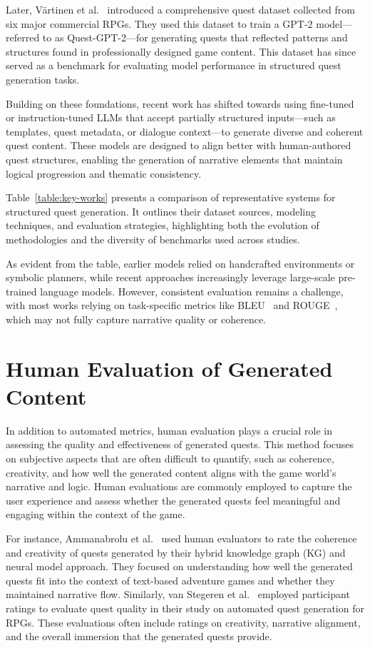 Later, V{\"a}rtinen et al.~\cite{vartinen2022generating} introduced a comprehensive quest dataset collected from
six major commercial RPGs. They used this dataset to train a GPT-2 model—referred
to as Quest-GPT-2—for generating quests that reflected patterns and structures found in
professionally designed game content. This dataset has since served as a benchmark for
evaluating model performance in structured quest generation tasks.

Building on these foundations, recent work has shifted towards using fine-tuned or
instruction-tuned LLMs that accept partially structured inputs—such as templates, quest
metadata, or dialogue context—to generate diverse and coherent quest content. These
models are designed to align better with human-authored quest structures, enabling the
generation of narrative elements that maintain logical progression and thematic consistency.

Table~\ref{table:key-works} presents a comparison of representative systems for structured quest generation.
It outlines their dataset sources, modeling techniques, and evaluation strategies,
highlighting both the evolution of methodologies and the diversity of benchmarks used
across studies.

As evident from the table, earlier models relied on handcrafted environments or symbolic
planners, while recent approaches increasingly leverage large-scale pre-trained language
models. However, consistent evaluation remains a challenge, with most works
relying on task-specific metrics like BLEU~\cite{papineni02bleu} and ROUGE~\cite{lin2004looking}, which may not fully
capture narrative quality or coherence.

\section{Human Evaluation of Generated Content}

In addition to automated metrics, human evaluation plays a crucial role in assessing
the quality and effectiveness of generated quests. This method focuses on subjective
aspects that are often difficult to quantify, such as coherence, creativity, and how well the
generated content aligns with the game world's narrative and logic. Human evaluations
are commonly employed to capture the user experience and assess whether the generated
quests feel meaningful and engaging within the context of the game.

For instance, Ammanabrolu et al.~\cite{ammanabrolu2019toward} used human evaluators to rate the coherence
and creativity of quests generated by their hybrid knowledge graph (KG) and neural
model approach. They focused on understanding how well the generated quests fit into
the context of text-based adventure games and whether they maintained narrative flow.
Similarly, van Stegeren et al.~\cite{van2021fine} employed participant ratings to evaluate quest quality
in their study on automated quest generation for RPGs. These evaluations often include
ratings on creativity, narrative alignment, and the overall immersion that the generated
quests provide.

